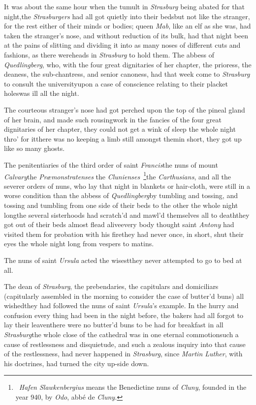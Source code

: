 \documentclass{article}
\begin{document}
It was about the same hour when the tumult in \textit{Strasburg}
being abated for that night,\tsh the \textit{Strasburgers} had all
got quietly into their beds\tsk but not like the stranger, for
the rest either of their minds or bodies; queen \textit{Mab}, like an
elf as she was, had taken the stranger’s nose, and without
reduction of its bulk, had that night been at the pains of slitting
and dividing it into as many noses of different cuts and fashions,
as there were\break heads in \textit{Strasburg} to hold them. The abbess of
\textit{Quedlingberg}, who, with the four great dignitaries of her
chapter, the prioress, the deaness, the sub-chantress, and senior
canoness, had that week come to \textit{Strasburg} to consult the
university\pb upon a case of conscience relating to their placket
holes\tsk was ill all the night.

The courteous stranger’s nose had got perched upon the top
of the pineal gland of her brain, and made such
rousing\break work in the
fancies of the four great dignitaries of her chapter, they could not get a wink of
sleep the whole night thro’ for it\tsh there was no
keeping a limb still amongst them\tsh in short, they got
up like so many ghosts.


The penitentiaries of the third order of saint \textit{Francis}\tsh the nuns of
mount \textit{Calvary}\tsk the \textit{Præmonstratenses}\tsh
the\break
\textit{Clunienses}~\footnote{~\textit{Hafen Slawkenbergius} means the Benedictine
nuns of \textit{Cluny}, founded in the year 940, by \textit{Odo}, abbé de
\textit{Cluny.}}\tsk the \textit{Carthusians}, and all the severer orders of nuns,
who lay that night in blankets or hair-cloth, were still\pb
in a worse condition than the abbess of
\textit{Quedlingberg}\tsk by tumbling and tossing, and
tossing and tumbling from one side of their beds to the
other the whole night long\tsk the several sisterhoods had
scratch’d and mawl’d themselves all to death\tsk they got
out of their beds almost flead alive\tsk every body thought
saint \textit{Antony} had visited them for probation with
his fire\tsh they had never once, in short, shut their eyes
the whole night long from vespers to matins.

The nuns of saint \textit{Ursula} acted the wisest\tsk they
never attempted to go to bed at all.

The dean of \textit{Strasburg}, the prebenda\-ries, the capitulars
and domiciliars (capitularly assembled in the morning to consider
the case of butter’d buns) all wished\pb they had followed the
nuns of saint \textit{Ursula}’s example.\tsh
In the hurry and confusion every thing had been in the night
before, the bakers had all forgot to lay their leaven\tsk there
were no butter’d buns to be had for breakfast in all
\textit{Strasburg}\tsk the whole close of the cathedral was in one
eternal commotion\tsk such a cause of restlessness and
disquietude, and such a zealous inquiry into that cause of the
restlessness, had never hap\-pened in \textit{Strasburg}, since
\textit{Martin Lut\-her}, with his doctrines, had turned the city
up-side down.
\end{document}
